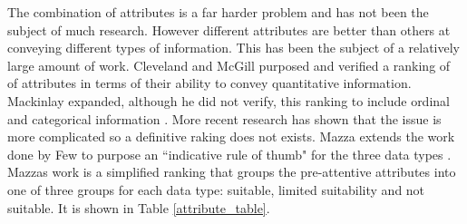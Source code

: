 \documentclass[a4paper, 11pt, titlepage, onehalfspacing]{report}
\begin{document}
The combination of attributes is a far harder problem and has not been the subject of much research. However different attributes are better than others at conveying different types of information. This has been the subject of a relatively large amount of work. Cleveland and McGill purposed and verified a ranking of of attributes in terms of their ability to convey quantitative information. Mackinlay expanded, although he did not verify, this ranking to include ordinal and categorical information \cite{mackinlay1986automating}. More recent research has shown that the issue is more complicated \cite{spence2001information} so a definitive raking does not exists. Mazza extends the work done by Few \cite{few2004show} to purpose an ``indicative rule of thumb" for the three data types \cite{mazza2009introduction}. Mazzas work is a simplified ranking that groups the pre-attentive attributes into one of three groups for each data type: suitable, limited suitability and not suitable. It is shown in Table \ref{attribute_table}.
\end{document}
